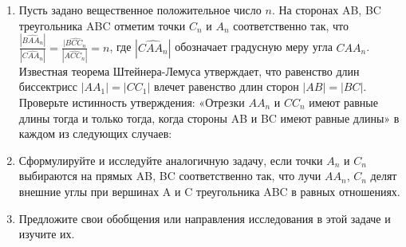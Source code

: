 \begin{enumerate}
\item Пусть задано вещественное положительное число $n$. На сторонах AB, BC треугольника ABC отметим точки $C_n$ и $A_n$ соответственно так, что ${\frac{|\widehat{BAA_n}|}{|\widehat{CAA_n}|}} = {\frac{|\widehat{BCC_n}}{|\widehat{ACC_n}|}} = n$, где $|\widehat{CAA_n}|$ обозначает градусную меру угла $CAA_n$. Известная теорема Штейнера-Лемуса утверждает, что равенство длин биссектрисс $|AA_1|=|CC_1|$ влечет равенство длин сторон $|AB|=|BC|$. Проверьте истинность утверждения: «Отрезки $AA_n$ и $CC_n$ имеют равные длины тогда и только тогда, когда стороны AB и BC имеют равные длины» в каждом из следующих случаев:\\
\item Сформулируйте и исследуйте аналогичную задачу, если точки $A_n$ и $C_n$ выбираются на прямых AB, BC соответственно так, что лучи $AA_n$, $C_n$ делят внешние углы при вершинах A и C треугольника ABC в равных отношениях.
\item Предложите свои обобщения или направления исследования в этой задаче и изучите их.
\end{enumerate}

